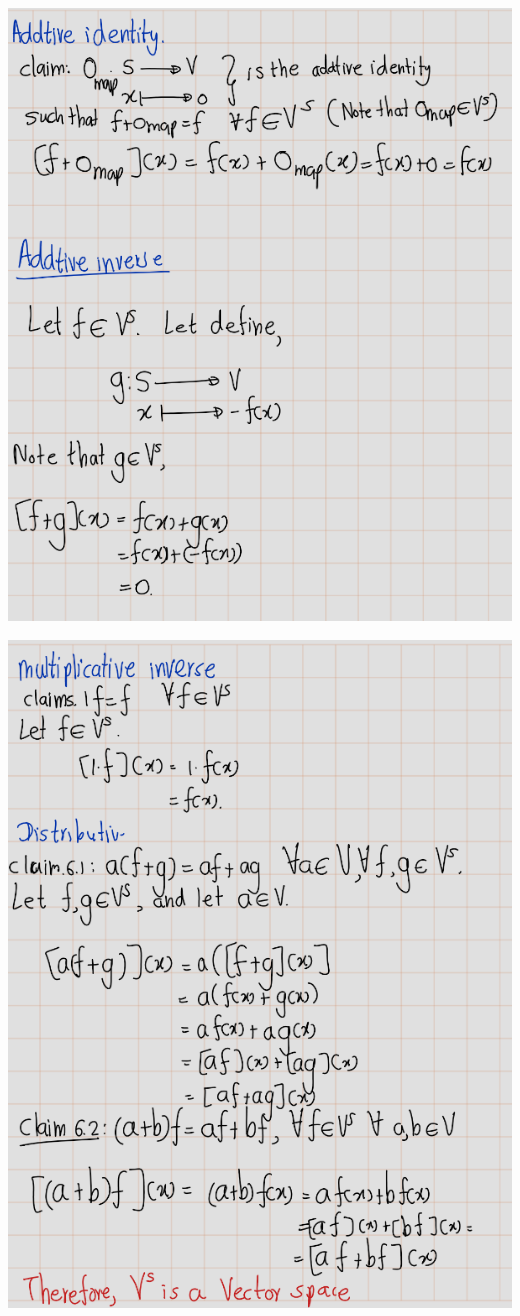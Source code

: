 \documentclass[
]{book}
\theoremstyle{definition}
\theoremstyle{definition}
\theoremstyle{definition}
\theoremstyle{definition}
\theoremstyle{remark}
\begin{document}
\includegraphics{fig/Ex1B/Ex7-3.png}

\includegraphics{fig/Ex1B/Ex7-4.png}
\end{document}
